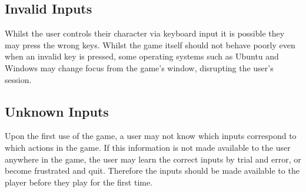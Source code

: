 \subsection*{Invalid Inputs}
    Whilst the user controls their character via keyboard input it
    is possible they may press the wrong keys. Whilst the game
    itself should not behave poorly even when an invalid key is
    pressed, some operating systems such as Ubuntu and Windows may
    change focus from the game's window, disrupting the user's session.

\subsection*{Unknown Inputs}
    Upon the first use of the game, a user may not know which inputs
    correspond to which actions in the game. If this information is
    not made available to the user anywhere in the game, the user
    may learn the correct inputs by trial and error, or become
    frustrated and quit. Therefore the inputs should be made
    available to the player before they play for the first time.
